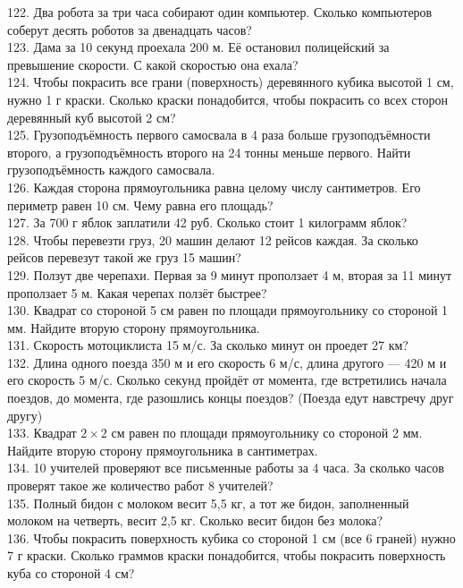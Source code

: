 \documentclass[12pt]{article}
\begin{document}
122. Два робота за три часа собирают один компьютер. Сколько компьютеров соберут десять роботов за двенадцать часов?\\
123. Дама за 10 секунд проехала 200 м. Её остановил полицейский за превышение скорости. С какой скоростью она ехала?\\
124. Чтобы покрасить все грани (поверхность) деревянного кубика высотой 1 см, нужно 1 г краски. Сколько краски понадобится, чтобы покрасить со всех сторон деревянный куб высотой 2 см?\\
125. Грузоподъёмность первого самосвала в 4 раза больше грузоподъёмности второго, а грузоподъёмность второго на 24 тонны меньше первого. Найти грузоподъёмность каждого самосвала.\\
126. Каждая сторона прямоугольника равна целому числу сантиметров. Его периметр равен 10 см. Чему равна его площадь?\\
127. За 700 г яблок заплатили 42 руб. Сколько стоит 1 килограмм яблок?\\
128. Чтобы перевезти груз, 20 машин делают 12 рейсов каждая. За сколько рейсов перевезут такой же груз 15 машин?\\
129. Ползут две черепахи. Первая за 9 минут проползает 4 м, вторая за 11 минут проползает 5 м. Какая черепах ползёт быстрее?\\
130. Квадрат со стороной 5 см равен по площади прямоугольнику со стороной 1 мм. Найдите вторую сторону прямоугольника.\\
131. Скорость мотоциклиста 15 м/с. За сколько минут он проедет 27 км?\\
132. Длина одного поезда 350 м и его скорость 6 м/с, длина другого --- 420 м и его скорость 5 м/с. Сколько секунд пройдёт от момента, где встретились начала поездов, до момента, где разошлись концы поездов? (Поезда едут навстречу друг другу)\\
133. Квадрат $2\times2$ см равен по площади прямоугольнику со стороной 2 мм. Найдите вторую сторону прямоугольника в сантиметрах.\\
134. 10 учителей проверяют все письменные работы за 4 часа. За сколько часов проверят такое же количество работ 8 учителей?\\
135. Полный бидон с молоком весит 5,5 кг, а тот же бидон, заполненный молоком на четверть, весит 2,5 кг. Сколько весит бидон без молока?\\
136. Чтобы покрасить поверхность кубика со стороной 1 см (все 6 граней) нужно 7 г краски. Сколько граммов краски понадобится, чтобы покрасить поверхность куба со стороной 4 см?\\
\end{document}
